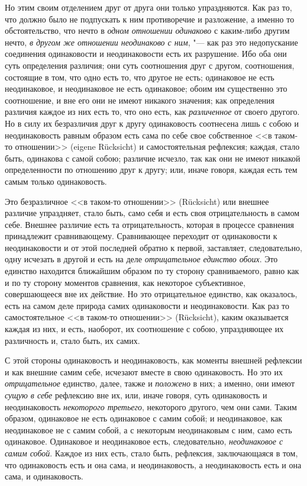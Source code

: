 Но этим своим отделением друг от друга они только упраздняются. Как раз то,
что должно было не подпускать к ним противоречие и разложение, а именно то
обстоятельство, что нечто в {\em одном отношении
одинаково} с каким-либо другим нечто,
{\em в другом же отношении неодинаково с ним}, "--- как раз это
недопускание соединения одинаковости и неодинаковости есть их разрушение.
Ибо оба они суть определения различия; они суть соотношения друг с другом,
соотношения, состоящие в том, что одно есть то, что другое не есть;
одинаковое не есть неодинаковое, и неодинаковое не есть одинаковое; обоим
им существенно это соотношение, и вне его они не имеют никакого значения;
как определения различия каждое из них есть то, что оно есть, как
{\em различенное} от своего другого. Но в силу их
безразличия друг к другу одинаковость соотнесена лишь с собою и
неодинаковость равным образом есть сама по себе свое собственное <<в
таком-то отношении>> (eigene Rücksicht) и самостоятельная рефлексия; каждая,
стало быть, одинакова с самой собою; различие исчезло, так как они не имеют
никакой определенности по отношению друг к другу; или, иначе говоря, каждая
есть тем самым только одинаковость.

Это безразличное <<в таком-то отношении>> (Rücksicht) или внешнее различие
упраздняет, стало быть, само себя и есть своя отрицательность в самом себе.
Внешнее различие есть та отрицательность, которая в процессе сравнения
принадлежит сравнивающему. Сравнивающее переходит от одинаковости к
неодинаковости и от этой последней обратно к первой, заставляет,
следовательно, одну исчезать в другой и есть на деле
{\em отрицательное единство обоих}. Это единство
находится ближайшим образом по ту сторону сравниваемого, равно как и по ту
сторону моментов сравнения, как некоторое субъективное, совершающееся вне
их действие. Но это отрицательное единство, как оказалось, есть на самом
деле природа самих одинаковости и неодинаковости. Как раз то
самостоятельное <<в таком-то отношении>> (Rücksicht), каким оказывается
каждая из них, и есть, наоборот, их соотношение с собою, упраздняющее их
различность и, стало быть, их самих.

С этой стороны одинаковость и неодинаковость, как моменты внешней рефлексии
и как внешние самим себе, исчезают вместе в свою одинаковость. Но это их
{\em отрицательное} единство, далее, также и
{\em положено} в них; а именно, они имеют
{\em сущую в себе} рефлексию вне их, или, иначе говоря,
суть одинаковость и неодинаковость {\em некоторого
третьего}, некоторого другого, чем они сами. Таким образом, одинаковое не
есть одинаковое с самим собой; и неодинаковое, как неодинаковое не с самим
собой, а с некоторым неодинаковым с ним, само есть одинаковое. Одинаковое и
неодинаковое есть, следовательно, {\em неодинаковое с
самим собой}. Каждое из них есть, стало быть, рефлексия, заключающаяся в
том, что одинаковость есть и она сама, и неодинаковость, а неодинаковость
есть и она сама, и одинаковость.

